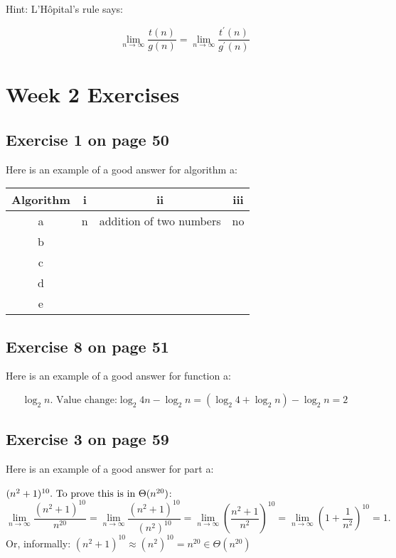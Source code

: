 \documentclass[12pt]{amsart}
\begin{document}
Hint: L'H\^{o}pital's rule says:

   \[\lim_{n \rightarrow \infty} \frac{t(n)}{g(n)} = \lim_{n \rightarrow \infty} \frac{t^{\prime}(n)}{g^{\prime}(n)}\]

\section{Week 2 Exercises}
\subsection{ Exercise 1 on page 50} $ $\\ 

Here is an example of a good answer for algorithm a:
  
  \begin{center}
\begin{tabular}{ |c|c|c|c| } 
 \hline
 \textbf{Algorithm} & \textbf{i} & \textbf{ii} & \textbf{iii} \\ 
 \hline
 a & n & addition of two numbers & no \\ 
 \hline
 b & & & \\ 
 \hline
 c & & & \\ 
 \hline
 d & & & \\
 \hline
 e & & & \\  
 \hline
\end{tabular}
\end{center}

\subsection{Exercise 8 on page 51} $ $\\ 

  Here is an example of a good answer for function a:

 \[\log_2 n\text{. Value change:}   \log_2 4n - \log_2 n = (\log_2 4 + \log_2 n) - \log_2 n = 2
\]


  
\subsection{Exercise 3 on page 59} $ $\\ 

  Here is an example of a good answer for part a:

 $(n^2 + 1)^{10}.\) To prove this is in \(\Theta(n^{20})$:
\[ \lim_{n \rightarrow \infty} \frac{(n^2 + 1)^{10}}{n^{20}} =
   \lim_{n \rightarrow \infty} \frac{(n^2 + 1)^{10}}{(n^2)^{10}} =
   \lim_{n \rightarrow \infty} \left( \frac{n^2 + 1}{n^2} \right)^{10} =
   \lim_{n \rightarrow \infty} \left( 1 + \frac{1}{n^2} \right)^{10} = 1.
\]
 Or, informally: $(n^2 + 1)^{10} \approx (n^2)^{10} = n^{20} \in \Theta(n^{20})$
\end{document}
